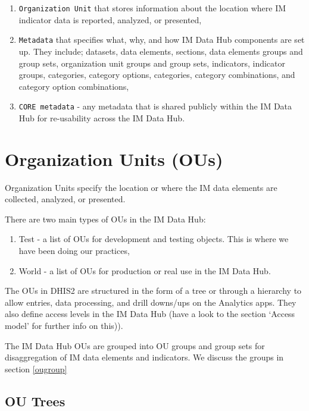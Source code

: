 \documentclass[]{book}
\providecommand{\tightlist}{%
  \setlength{\itemsep}{0pt}\setlength{\parskip}{0pt}}
\begin{document}
\begin{enumerate}
\def\labelenumi{\arabic{enumi}.}
\tightlist
\item
  \texttt{Organization\ Unit} that stores information about the location where IM indicator data is reported, analyzed, or presented,
\item
  \texttt{Metadata} that specifies what, why, and how IM Data Hub components are set up. They include; datasets, data elements, sections, data elements groups and group sets, organization unit groups and group sets, indicators, indicator groups, categories, category options, categories, category combinations, and category option combinations,
\item
  \texttt{CORE\ metadata} - any metadata that is shared publicly within the IM Data Hub for re-usability across the IM Data Hub.
\end{enumerate}

\hypertarget{organization-units-ous}{%
\section{Organization Units (OUs)}\label{organization-units-ous}}

Organization Units specify the location or where the IM data elements are collected, analyzed, or presented.

There are two main types of OUs in the IM Data Hub:

\begin{enumerate}
\def\labelenumi{\arabic{enumi}.}
\tightlist
\item
  Test - a list of OUs for development and testing objects. This is where we have been doing our practices,
\item
  World - a list of OUs for production or real use in the IM Data Hub.
\end{enumerate}

The OUs in DHIS2 are structured in the form of a tree or through a hierarchy to allow entries, data processing, and drill downs/ups on the Analytics apps. They also define access levels in the IM Data Hub (have a look to the section `Access model' for further info on this)).

The IM Data Hub OUs are grouped into OU groups and group sets for disaggregation of IM data elements and indicators. We discuss the groups in section \ref{ougroup}

\hypertarget{ou-trees}{%
\subsection{OU Trees}\label{ou-trees}}
\end{document}
